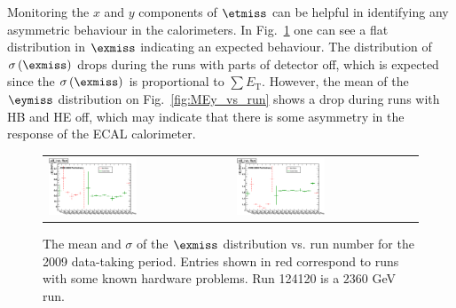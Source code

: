 Monitoring the $x$ and $y$ components of $\etmiss$ can be helpful in
identifying any asymmetric behaviour in the
calorimeters. In Fig.~\ref{fig:MEx_vs_run} one can see a flat
distribution in $\exmiss$ indicating an expected behaviour. The
distribution of $\sigma\left(\exmiss\right)$ drops during the runs with parts of
detector off, which is expected since the $\sigma\left(\exmiss\right)$ is
proportional to $\sum E_\text{T}$. However, the mean of the $\eymiss$ distribution on
Fig.~\ref{fig:MEy_vs_run} shows a drop during runs with HB and HE off,
which may indicate that there is some asymmetry in the response of the
ECAL calorimeter.

\begin{figure}[h!]
  \centering
  \begin{tabular}{ll}
    \includegraphics[width=0.5\textwidth]{plots_METStability/h_calometPxMean_vs_run.eps} &
    \includegraphics[width=0.5\textwidth]{plots_METStability/h_calometPxSigma_vs_run.eps} \\
  \end{tabular}
  \caption{\small The mean and $\sigma$ of the $\exmiss$ distribution
    vs. run number for the 2009 data-taking period.  Entries shown in
    red correspond to runs with some known hardware problems. Run 124120 is a $2360$ GeV run.\label{fig:MEx_vs_run}}
\end{figure}

